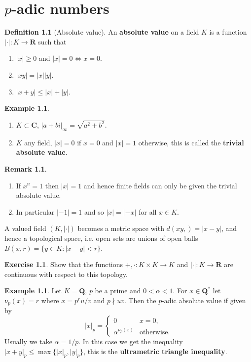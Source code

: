 \documentclass[10pt,]{book}
\newcommand{\lt}{<}
\newcommand{\terminology}[1]{\textbf{#1}}
\theoremstyle{plain}
\theoremstyle{definition}
\newtheorem{definition}[theorem]{Definition}
\newtheorem{example}[theorem]{Example}
\newtheorem{exercise}[theorem]{Exercise}
\newtheorem{remark}[theorem]{Remark}
\newcommand{\CC}{\mathbf{C}}
\newcommand{\QQ}{\mathbf{Q}}
\newcommand{\RR}{\mathbf{R}}
\newcommand{\ab}{|\cdot|}
\begin{document}
\chapter[\(p\)-adic numbers]{\(p\)-adic numbers}\label{chap-padic}
\begin{definition}[Absolute value]\label{definition-1}
An \terminology{absolute value} on a field \(K\) is a function \(\ab\colon K \to \RR\) such that
          \begin{enumerate}
\item{}\(|x|\ge 0\) and \(|x| = 0 \iff x = 0\).\item{}\(|xy| = |x||y|\).\item{}\(|x + y| \le |x| + |y|\).\end{enumerate}
\end{definition}
\begin{example}\label{example-1}
\begin{enumerate}
\item{}\(K \subset \CC\), \(|a+bi|_{\infty} = \sqrt{a^2 + b^2}\).\item{}\(K\) any field, \(|x| = 0\) if \(x = 0\) and \(|x| = 1\) otherwise, this is called the \terminology{trivial absolute value}.\end{enumerate}
\end{example}
\begin{remark}\label{remark-1}
\begin{enumerate}
\item{}If \(x^n = 1\) then \(|x|  = 1\) and hence finite fields can only be given the trivial absolute value.\item{}In particular \(| -1| = 1\) and so \(|x| = |-x|\) for all \(x \in K\).\end{enumerate}
\end{remark}
A valued field \((K, \ab)\) becomes a metric space with \(d(xy,) = |x-y|\), and hence a topological space, i.e. open sets are unions of open balls \(B(x,r) = \{y\in K : |x-y| \lt r\}\).%
\begin{exercise}\label{exercise-1}
Show that the functions \(+,\cdot \colon K\times K \to K\) and \(\ab\colon K \to \RR\) are continuous with respect to this topology.\end{exercise}
\begin{example}\label{example-2}
Let \(K = \QQ,\, p\) be a prime and \(0 \lt \alpha \lt 1\).
          For \(x\in \QQ^*\) let \(\nu_p(x) = r\) where \(x = p^r u/ v\) and \(p\nmid uv\).
          Then the \(p\)-adic absolute value if given by \[|x|_p = \begin{cases} 0 & x = 0,\\ \alpha^{\nu_p(x)} & \text{otherwise}.\end{cases}\]
          Usually we take \(\alpha = 1/p\).
          In this case we get the inequality \(|x+ y|_p \le \max\{|x|_p, |y|_p\}\), this is the \terminology{ultrametric triangle inequality}.
        \end{example}
\end{document}
